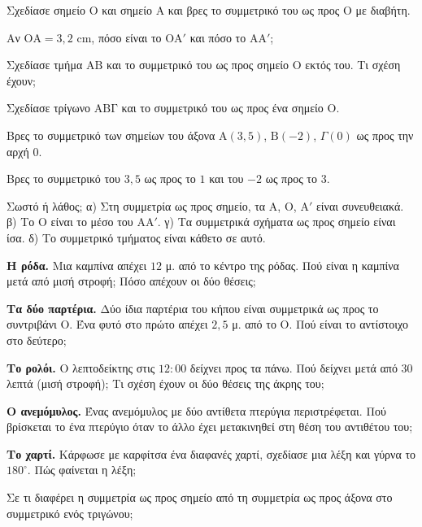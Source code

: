 

\ex Σχεδίασε σημείο $\mathrm{Ο}$ και σημείο $\mathrm{Α}$ και βρες το συμμετρικό του ως προς $\mathrm{Ο}$ με διαβήτη.

\ex Αν $\mathrm{ΟΑ}=3{,}2$ cm, πόσο είναι το $\mathrm{ΟΑ}'$ και πόσο το $\mathrm{ΑΑ}'$;

\ex Σχεδίασε τμήμα $\mathrm{ΑΒ}$ και το συμμετρικό του ως προς σημείο $\mathrm{Ο}$ εκτός του. Τι σχέση έχουν;

\ex Σχεδίασε τρίγωνο $\mathrm{ΑΒΓ}$ και το συμμετρικό του ως προς ένα σημείο $\mathrm{Ο}$.

\ex Βρες το συμμετρικό των σημείων του άξονα $\mathrm{Α}(3{,}5)$, $\mathrm{Β}(-2)$, $\Gamma(0)$ ως προς την αρχή $0$.

\ex Βρες το συμμετρικό του $3{,}5$ ως προς το $1$ και του $-2$ ως προς το $3$.

\ex Σωστό ή λάθος; α) Στη συμμετρία ως προς σημείο, τα $\mathrm{Α}$, $\mathrm{Ο}$, $\mathrm{Α}'$ είναι συνευθειακά. \quad β) Το $\mathrm{Ο}$ είναι το μέσο του $\mathrm{ΑΑ}'$. \quad γ) Τα συμμετρικά σχήματα ως προς σημείο είναι ίσα. \quad δ) Το συμμετρικό τμήματος είναι κάθετο σε αυτό.


\ex \textbf{Η ρόδα.} Μια καμπίνα απέχει $12$ μ. από το κέντρο της ρόδας. Πού είναι η καμπίνα μετά από μισή στροφή; Πόσο απέχουν οι δύο θέσεις;

\ex \textbf{Τα δύο παρτέρια.} Δύο ίδια παρτέρια του κήπου είναι συμμετρικά ως προς το συντριβάνι $\mathrm{Ο}$. Ένα φυτό στο πρώτο απέχει $2{,}5$ μ. από το $\mathrm{Ο}$. Πού είναι το αντίστοιχο στο δεύτερο;

\ex \textbf{Το ρολόι.} Ο λεπτοδείκτης στις $12{:}00$ δείχνει προς τα πάνω. Πού δείχνει μετά από $30$ λεπτά (μισή στροφή); Τι σχέση έχουν οι δύο θέσεις της άκρης του;

\ex \textbf{Ο ανεμόμυλος.} Ένας ανεμόμυλος με δύο αντίθετα πτερύγια περιστρέφεται. Πού βρίσκεται το ένα πτερύγιο όταν το άλλο έχει μετακινηθεί στη θέση του αντιθέτου του;

\ex \textbf{Το χαρτί.} Κάρφωσε με καρφίτσα ένα διαφανές χαρτί, σχεδίασε μια λέξη και γύρνα το $180^\circ$. Πώς φαίνεται η λέξη;


\ex Σε τι διαφέρει η συμμετρία ως προς σημείο από τη συμμετρία ως προς άξονα στο συμμετρικό ενός τριγώνου;

